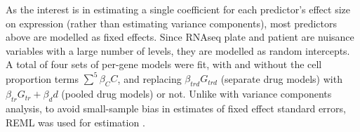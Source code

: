 As the interest is in estimating a single coefficient for each predictor's effect size on expression (rather than estimating variance components), 
most predictors above are modelled as fixed effects.
Since \gls{RNAseq} plate and patient are nuisance variables with a large number of levels, they are modelled as random intercepts.
A total of four sets of per-gene models were fit,
with and without the cell proportion terms $\sum_{}^{5}{\beta_C C}$,
and replacing $\beta_{trd} G_{trd}$ (separate drug models) with $\beta_{tr} G_{tr} + \beta_d d$ (pooled drug models) or not.
%
Unlike with variance components analysis,
to avoid small-sample bias in estimates of fixed effect standard errors, \gls{REML} was used for estimation \autocite{mcneish2017SmallSampleMethods}.

